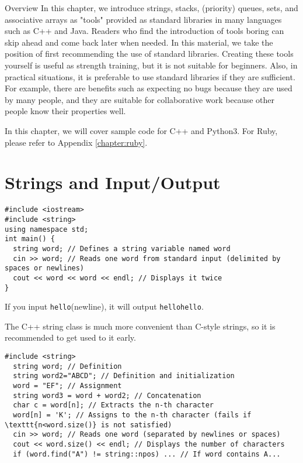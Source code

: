 \begin{itembox}[l]{Overview}
In this chapter, we introduce strings, stacks, (priority) queues, sets, and associative arrays as "tools" provided as standard libraries in many languages such as C++ and Java.
Readers who find the introduction of tools boring can skip ahead and come back later when needed. In this material, we take the position of first recommending the use of standard libraries. Creating these tools yourself is useful as strength training, but it is not suitable for beginners. Also, in practical situations, it is preferable to use standard libraries if they are sufficient.
For example, there are benefits such as expecting no bugs because they are used by many people, and they are suitable for collaborative work because other people know their properties well.

In this chapter, we will cover sample code for C++ and Python3. For Ruby, please refer to Appendix \ref{chapter:ruby}.
\end{itembox}
\section{Strings and Input/Output}

\begin{cbox}[emph={string}]
\begin{verbatim}
#include <iostream>
#include <string>
using namespace std;
int main() {
  string word; // Defines a string variable named word
  cin >> word; // Reads one word from standard input (delimited by spaces or newlines)
  cout << word << word << endl; // Displays it twice
}
\end{verbatim}
\end{cbox}

If you input \texttt{hello}(newline), it will output \texttt{hellohello}.

The C++ string class is much more convenient than C-style strings, so it is recommended to get used to it early.

\begin{cbox}
\begin{verbatim}
#include <string>
  string word; // Definition
  string word2="ABCD"; // Definition and initialization
  word = "EF"; // Assignment
  string word3 = word + word2; // Concatenation
  char c = word[n]; // Extracts the n-th character
  word[n] = 'K'; // Assigns to the n-th character (fails if \texttt{n<word.size()} is not satisfied)
  cin >> word; // Reads one word (separated by newlines or spaces)
  cout << word.size() << endl; // Displays the number of characters
  if (word.find("A") != string::npos) ... // If word contains A...
\end{verbatim}
\end{cbox}

